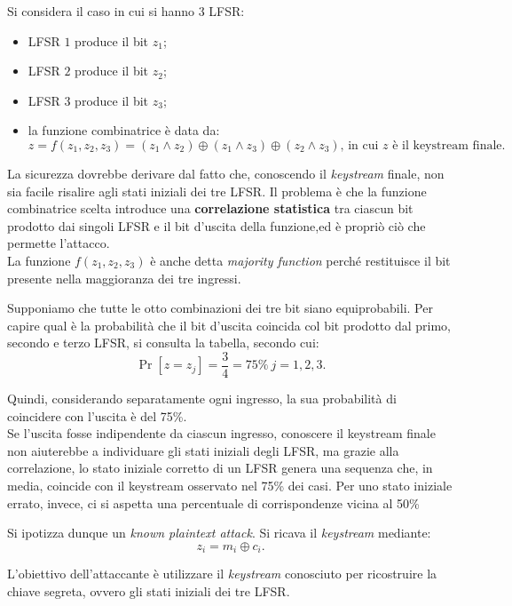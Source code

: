 \noindent Si considera il caso in cui si hanno 3 LFSR:
    \begin{itemize}
        \item LFSR $1$ produce il bit $z_1$;
        \item LFSR $2$ produce il bit $z_2$;
        \item LFSR $3$ produce il bit $z_3$;
        \item la funzione combinatrice è data da: \[z=f(z_1, z_2, z_3)=(z_1 \land z_2) \oplus (z_1 \land z_3) \oplus (z_2 \land z_3) \text{, in cui $z$ è il keystream finale. } \]
    \end{itemize}

\noindent La sicurezza dovrebbe derivare dal fatto che, conoscendo il \textit{keystream} finale, non sia facile risalire agli stati iniziali dei tre LFSR. Il problema è che la funzione combinatrice scelta introduce una \textbf{correlazione statistica} tra ciascun bit prodotto dai singoli LFSR e il bit d’uscita della funzione,ed è propriò ciò che permette l'attacco. \\ La funzione $f(z_1, z_2, z_3)$ è anche detta \textit{majority function} perché restituisce il bit presente nella maggioranza dei tre ingressi. 

\vspace{1em} \noindent Supponiamo che tutte le otto combinazioni dei tre bit siano equiprobabili. Per capire qual è la probabilità che il bit d'uscita coincida col bit prodotto dal primo, secondo e terzo LFSR, si consulta la tabella, secondo cui: 
\[
\Pr[z=z_j]=\frac{3}{4}=75\% \ j=1,2,3.
\] 

\noindent Quindi, considerando separatamente ogni ingresso, la sua probabilità di coincidere con l'uscita è del 75\%. \\ Se l'uscita fosse indipendente da ciascun ingresso, conoscere il keystream finale non aiuterebbe a individuare gli stati iniziali degli LFSR, ma grazie alla correlazione, lo stato iniziale corretto di un LFSR genera una sequenza che, in media, coincide con il keystream osservato nel 75\% dei casi. Per uno stato iniziale errato, invece, ci si aspetta una percentuale di corrispondenze vicina al 50\%

\vspace{1em} \noindent Si ipotizza dunque un \textit{known plaintext attack}. Si ricava il \textit{keystream} mediante: 
\[
z_i=m_i \oplus c_i.
\]

L'obiettivo dell'attaccante è utilizzare il \textit{keystream} conosciuto per ricostruire la chiave segreta, ovvero gli stati iniziali dei tre LFSR. 

